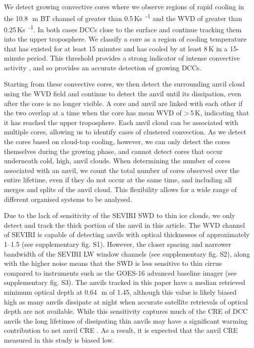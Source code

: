 \documentclass[acp, manuscript]{copernicus}
\begin{document}
We detect growing convective cores where we observe regions of rapid cooling in the 10.8\,\unit{\mu m} BT channel of greater than 0.5\,\unit{Ks\textsuperscript{-1}} and the WVD of greater than 0.25\,\unit{Ks\textsuperscript{-1}}.
In both cases
DCCs close to the surface and continue tracking them into the upper troposphere. 
We classify a core as a region of cooling temperature that has existed for at least 15 minutes and has cooled by at least 8\,\unit{K} in a 15-minute period. 
This threshold provides a strong indicator of intense convective activity \citep{roberts_nowcasting_2003}, and so provides an accurate detection of growing DCCs.

Starting from these convective cores, we then detect the surrounding anvil cloud using the WVD field \citep{muller_role_2018, muller_novel_2019} and continue to detect the anvil until its dissipation, even after the core is no longer visible. 
A core and anvil are linked with each other if the two overlap at a time when the core has mean WVD of \textgreater\,5\,\unit{K}, indicating that it has reached the upper troposphere.
Each anvil cloud can be associated with multiple cores, allowing us to identify cases of clustered convection. 
As we detect the cores based on cloud-top cooling, however, we can only detect the cores themselves during the growing phase, and cannot detect cores that occur underneath cold, high, anvil clouds.
When determining the number of cores associated with an anvil, we count the total number of cores observed over the entire lifetime, even if they do not occur at the same time, and including all merges and splits of the anvil cloud.
This flexibility allows for a wide range of different organised systems to be analysed.

Due to the lack of sensitivity of the SEVIRI SWD to thin ice clouds, we only detect and track the thick portion of the anvil in this article.
The WVD channel of SEVIRI is capable of detecting anvils with optical thicknesses of approximately 1--1.5 (see supplementary fig. S1).
However, the closer spacing and narrower bandwidth of the SEVIRI LW window channels (see supplementary fig. S2), along with the higher noise means that the SWD is less sensitive to thin cirrus compared to instruments such as the GOES-16 advanced baseline imager (see supplementary fig. S3).
The anvils tracked in this paper have a median retrieved minimum optical depth at 0.64\,\unit{\mu m} of 1.45, although this value is likely biased high as many anvils dissipate at night when accurate satellite retrievals of optical depth are not available.
While this sensitivity captures much of the CRE of DCC anvils \citep{berry_cloud_2014} the long lifetimes of dissipating thin anvils may have a significant warming contribution to net anvil CRE \citep{horner_evolution_2023}.
As a result, it is expected that the anvil CRE measured in this study is biased low.
\end{document}
